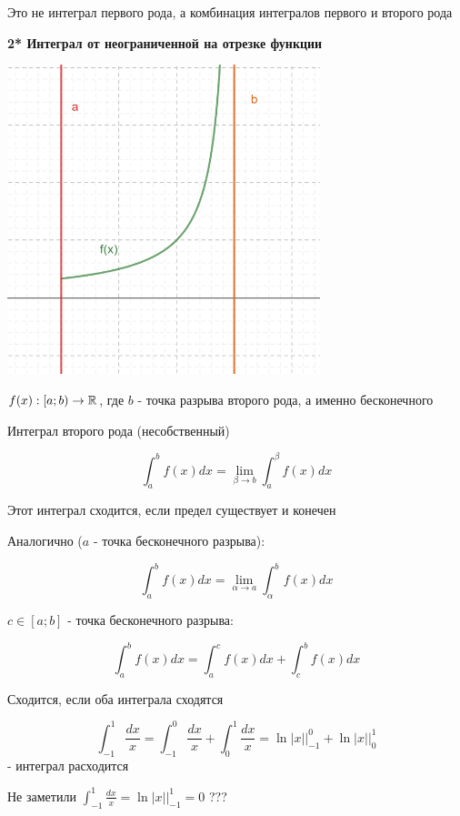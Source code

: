 \documentclass[12pt]{article}
\begin{document}
    Это не интеграл первого рода, а комбинация интегралов первого и второго рода

    \textbf{2* Интеграл от неограниченной на отрезке функции}

    \includegraphics[height=90mm]{calculus/images/calculus_2024_02_21_4}

    $f(x) : [a; b) \to \mathbb{R}$, где $b$ - точка разрыва второго рода, а именно бесконечного

     \hypertarget{improperintegralsecondkind}{Интеграл второго рода (несобственный)}

    \[\int^{b}_{a} f(x) dx = \lim_{\beta \to b} \int^{\beta}_{a} f(x) dx\]

    Этот интеграл сходится, если предел существует и конечен

     Аналогично ($a$ - точка бесконечного разрыва):

    \[\int^{b}_{a} f(x) dx = \lim_{\alpha \to a} \int^{b}_{\alpha} f(x) dx\]

     $c \in [a;b]$ - точка бесконечного разрыва:

    \[\int^{b}_{a} f(x) dx = \int^{c}_{a} f(x) dx + \int^{b}_{c} f(x) dx\]

    Сходится, если оба интеграла сходятся


    \[\int^{1}_{-1} \frac{dx}{x} = \int^{0}_{-1} \frac{dx}{x} + \int^{1}_{0} \frac{dx}{x} =
    \ln |x| \Big|^{0}_{-1} + \ln |x| \Big|^{1}_{0}\] - интеграл расходится

    Не заметили $\displaystyle \int^{1}_{-1} \frac{dx}{x} = \ln |x| \Big|^{1}_{-1} = 0$ ???

\end{document}
